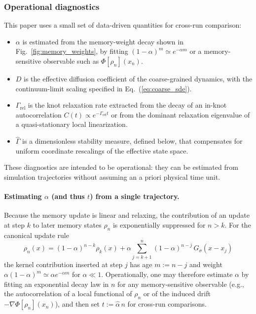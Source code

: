 \documentclass[reprint,amsmath,amssymb,aps,prd,nofootinbib,floatfix]{revtex4-2}
\begin{document}
\subsubsection{Operational diagnostics}

This paper uses a small set of data-driven quantities for cross-run comparison:
\begin{itemize}
\item $\alpha$ is estimated from the memory-weight decay shown in Fig.~\ref{fig:memory_weights}, by fitting $(1-\alpha)^m\simeq e^{-\alpha m}$ or a memory-sensitive observable such as $\Phi[\rho_n](x_n)$.
\item $D$ is the effective diffusion coefficient of the coarse-grained dynamics, with the continuum-limit scaling specified in Eq.~(\ref{eq:coarse_sde}).
\item $\Gamma_{\mathrm{rel}}$ is the knot relaxation rate extracted from the decay of an in-knot autocorrelation $C(t)\propto e^{-\Gamma_{\mathrm{rel}} t}$ or from the dominant relaxation eigenvalue of a quasi-stationary local linearization.
\item $\widehat{\Gamma}$ is a dimensionless stability measure, defined below, that compensates for uniform coordinate rescalings of the effective state space.
\end{itemize}

These diagnostics are intended to be operational: they can be estimated from simulation trajectories without assuming an a priori physical time unit.

\paragraph{Estimating $\alpha$ (and thus $t$) from a single trajectory.}
Because the memory update is linear and relaxing, the contribution of an update at step $k$ to later memory states $\rho_n$ is exponentially suppressed for $n\!>\!k$.
For the canonical update rule
\begin{equation}\label{eq:rho_linear_solution}
\rho_{n}(x)=(1-\alpha)^{n-k}\rho_{k}(x)
+\alpha\sum_{j=k+1}^{n}(1-\alpha)^{n-j}\,G_\sigma(x-x_{j})
\end{equation}
the kernel contribution inserted at step $j$ has age $m:=n-j$ and weight $\alpha(1-\alpha)^m\simeq\alpha e^{-\alpha m}$ for $\alpha\ll 1$.
Operationally, one may therefore estimate $\alpha$ by fitting an exponential decay law in $n$ for any memory-sensitive observable (e.g., the autocorrelation of a local functional of $\rho_n$ or of the induced drift $-\nabla\Phi[\rho_n](x_n)$), and then set $t:=\widehat{\alpha}\,n$ for cross-run comparisons.
\end{document}
